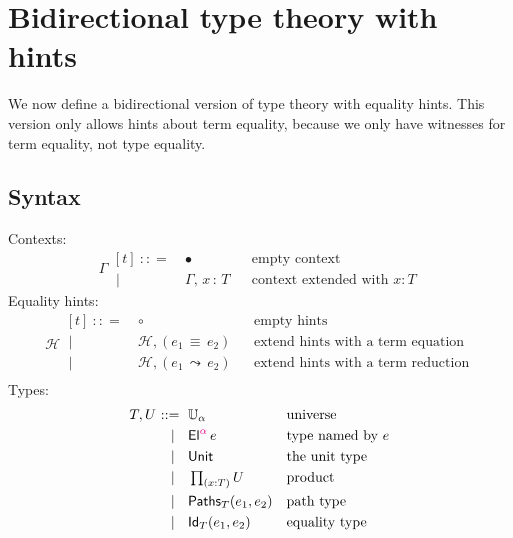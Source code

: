 \documentclass{article}
\newcommand{\G}{\Gamma} %
\newcommand{\T}{T} %
\newcommand{\U}{U} %
\newcommand{\x}{x} %
\newcommand{\e}{e} %
\newcommand{\bnf}{\ \mathrel{{:}{:}{=}}\ }
\newcommand{\bnfor}{\ \mid\ \ }
\newcommand{\ctxempty}{\bullet} %
\newcommand{\ctxextend}[3]{#1,\, #2\, {:}\, #3} %
\newcommand{\Universe}[1]{\mathbb{U}_{#1}} %
\newcommand{\El}[2]{\mathsf{El}^{#1}\, #2} %
\newcommand{\Unit}{\mathsf{Unit}} %
\newcommand{\Prod}[2]{\mathop{\textstyle\prod_{(#1 {:} #2)}}} %
\newcommand{\PrEqual}[3]{\mathsf{Paths}_{#1}(#2,#3)} %
\newcommand{\JuEqual}[3]{\mathsf{Id}_{#1}(#2,#3)} %
\newcommand{\eqtermhint}[2]{(#1 \,{\equiv}\, #2)} %
\newcommand{\redtermhint}[2]{(#1 \,{\leadsto}\, #2)} %
\renewcommand{\H}{\mathcal{H}}      %
\newcommand{\hintempty}{\circ}      %
\newcommand{\addhinteq}[3]{#1, \eqtermhint{#2}{#3}} %
\newcommand{\addhintred}[3]{#1, \redtermhint{#2}{#3}} %
\newcommand{\inferred}[1]{{\color{magenta}{#1}}}
\begin{document}
\section{Bidirectional type theory with hints}
\label{sec:bidir-type-theory}

We now define a bidirectional version of type theory with equality hints. This version
only allows hints about term equality, because we only have witnesses for term equality,
not type equality.

\subsection{Syntax}
\label{sec:syntax-bidirectional}

Contexts:
%
\begin{equation*}
  \G
  \begin{aligned}[t]
    \bnf   {}& \ctxempty & & \text{empty context}\\
    \bnfor {}& \ctxextend{\G}{\x}{\T} & & \text{context extended with $x : T$}
  \end{aligned}
\end{equation*}
%
Equality hints:
%
\begin{equation*}
  \H
  \begin{aligned}[t]
    \bnf   {}& \hintempty & & \text{empty hints}\\
    \bnfor {}& \addhinteq{\H}{\e_1}{\e_2} & & \text{extend hints with a term equation} \\
    \bnfor {}& \addhintred{\H}{\e_1}{\e_2} & & \text{extend hints with a term reduction} \\
  \end{aligned}
\end{equation*}
%
Types:
%
\begin{equation*}
  \T, \U
  \begin{aligned}[t]
    \bnf   {}& \Universe{\alpha} & & \text{universe}\\
    \bnfor {}& \El{\inferred\alpha}{\e} & & \text{type named by $e$}\\
    \bnfor {}& \Unit & & \text{the unit type}\\
    \bnfor {}& \Prod{x}{\T} \U & & \text{product}\\
    \bnfor {}& \PrEqual{T}{\e_1}{\e_2} & & \text{path type}\\
    \bnfor {}& \JuEqual{T}{\e_1}{\e_2} & & \text{equality type}
  \end{aligned}
\end{equation*}
%
\end{document}

